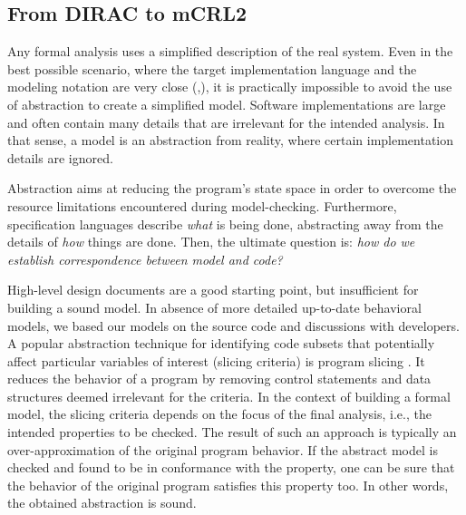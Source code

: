 \documentclass[sort&compress,preprint,3p]{elsarticle}
\begin{document}
\subsection{From DIRAC to mCRL2}

Any formal analysis uses a simplified description of the real system. Even in the 
best possible scenario, where the target implementation language and the modeling 
notation are very close (\cite{Java_PathFinder},\cite{Musuvathi04modelchecking}), 
it is practically impossible to avoid the use of abstraction to create a simplified model. 
Software implementations are large and often contain many details that are irrelevant 
for the intended analysis. In that sense, a model is an abstraction from reality,
where certain implementation details are ignored.

Abstraction aims at reducing
the program's state space in order to overcome the resource limitations \cite{Pelánek08fightingstate} encountered during model-checking. 
Furthermore, specification languages describe \textit{what} is being done, 
abstracting away from the details of \textit{how} things are done. 
Then, the ultimate question is: \textit{how do we establish correspondence between model and code?}

High-level design documents are a good starting point, but insufficient for 
building a sound model.
In absence of more detailed up-to-date behavioral models, 
we based our models on the source code and discussions with developers.
A popular abstraction technique
for identifying code subsets that potentially affect particular 
variables of interest (slicing criteria) is program slicing \cite{Hatcliff99slicingsoftware}. 
It reduces the behavior of a program
by removing control statements and data structures deemed irrelevant for 
the criteria. In the context of building a formal model, the slicing criteria 
depends on the focus of the final analysis, i.e., the intended properties to be checked.
The result of such an approach is typically an over-approximation of the original program behavior.
If the abstract model is checked and found to be in conformance with the property,
one can be sure that the behavior of the original program satisfies this property too. 
In other words, the obtained abstraction is sound.
\end{document}
